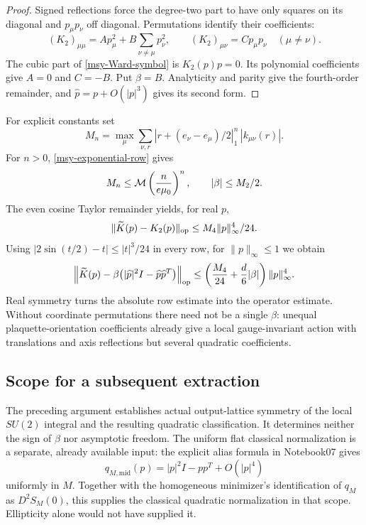 \documentclass[11pt]{article}
\theoremstyle{remark}
\begin{document}
\begin{proof}
Signed reflections force the degree-two part to have only
squares on its diagonal and \(p_\mu p_\nu\) off diagonal.
Permutations identify their coefficients:
\[
 (K_2)_{\mu\mu}=A p_\mu^2+
                  B\sum_{\nu\ne\mu}p_\nu^2,\qquad
 (K_2)_{\mu\nu}=C p_\mu p_\nu\quad(\mu\ne\nu).
\]
The cubic part of \eqref{msy-Ward-symbol} is \(K_2(p)p=0\).
Its polynomial coefficients give \(A=0\) and \(C=-B\).
Put \(\beta=B\). Analyticity and parity give the fourth-order
remainder, and \(\widehat p=p+O(|p|^3)\) gives its second form.
\end{proof}

For explicit constants set
\begin{equation}
 M_n=\max_\mu\sum_{\nu,r}
 |r+(e_\nu-e_\mu)/2|_1^n\,|k_{\mu\nu}(r)|.
 \label{msy-moments}
\end{equation}
For \(n>0\), \eqref{msy-exponential-row} gives
\[
 M_n\le{\cal M}\left(\frac{n}{e\mu_0}\right)^n,
 \qquad |\beta|\le M_2/2.
\]
The even cosine Taylor remainder yields, for real \(p\),
\[
 \|\widetilde K(p)-K_2(p)\|_{\rm op}
               \le M_4\|p\|_\infty^4/24.
\]
Using \(|2\sin(t/2)-t|\le|t|^3/24\) in every row,
for \(\|p\|_\infty\le1\) we obtain
\begin{equation}
 \left\|\widetilde K(p)
       -\beta\bigl(|\widehat p|^2I-
                        \widehat p\widehat p^T\bigr)\right\|_{\rm op}
 \le\left(\frac{M_4}{24}+\frac d6|\beta|\right)
                              \|p\|_\infty^4 .
 \label{msy-quantitative-remainder}
\end{equation}
Real symmetry turns the absolute row estimate into the
operator estimate. Without coordinate permutations there
need not be a single \(\beta\): unequal plaquette-orientation
coefficients already give a local gauge-invariant action
with translations and axis reflections but several
quadratic coefficients.

\subsection{Scope for a subsequent extraction}
\label{msy-scope-section}

The preceding argument establishes actual output-lattice
symmetry of the local \(SU(2)\) integral and the resulting
quadratic classification. It determines neither the sign
of \(\beta\) nor asymptotic freedom. The uniform flat
classical normalization is a separate, already available
input: the explicit alias formula in Notebook07 gives
\[
 q_{M,\mathrm{mid}}(p)=|p|^2I-pp^T+O(|p|^4)
\]
uniformly in \(M\). Together with the homogeneous minimizer's
identification of \(q_M\) as \(D^2S_M(0)\), this supplies
the classical quadratic normalization in that scope.
Ellipticity alone would not have supplied it.
\end{document}
